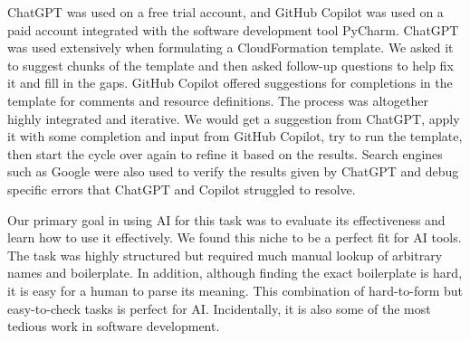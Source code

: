 ChatGPT was used on a free trial account, and GitHub Copilot was used on a paid account integrated with the software development tool PyCharm. ChatGPT was used extensively when formulating a CloudFormation template. We asked it to suggest chunks of the template and then asked follow-up questions to help fix it and fill in the gaps. GitHub Copilot offered suggestions for completions in the template for comments and resource definitions. The process was altogether highly integrated and iterative. We would get a suggestion from ChatGPT, apply it with some completion and input from GitHub Copilot, try to run the template, then start the cycle over again to refine it based on the results. Search engines such as Google were also used to verify the results given by ChatGPT and debug specific errors that ChatGPT and Copilot struggled to resolve. 

Our primary goal in using AI for this task was to evaluate its effectiveness and learn how to use it effectively. We found this niche to be a perfect fit for AI tools. The task was highly structured but required much manual lookup of arbitrary names and boilerplate. In addition, although finding the exact boilerplate is hard, it is easy for a human to parse its meaning. This combination of hard-to-form but easy-to-check tasks is perfect for AI. Incidentally, it is also some of the most tedious work in software development. 
